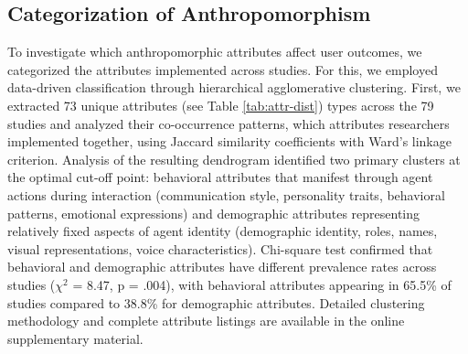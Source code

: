 \documentclass[manuscript,anonymous,sigconf]{acmart}
\begin{document}
\subsection{Categorization of Anthropomorphism}

To investigate which anthropomorphic attributes affect user outcomes, we categorized the attributes implemented across studies. For this, we employed data-driven classification through hierarchical agglomerative clustering. First, we extracted 73 unique attributes 
(see Table \ref{tab:attr-dist}) 
types across the 79 studies and analyzed their co-occurrence patterns, which attributes researchers implemented together, using Jaccard similarity coefficients with Ward's linkage criterion. %
Analysis of the resulting dendrogram identified two primary clusters at the optimal cut-off point: behavioral attributes that manifest through agent actions during interaction (communication style, personality traits, behavioral patterns, emotional expressions) and demographic attributes representing relatively fixed aspects of agent identity (demographic identity, roles, names, visual representations, voice characteristics). Chi-square test confirmed that behavioral and demographic attributes have different prevalence rates across studies ($\chi^2$ = 8.47, p = .004), with behavioral attributes appearing in 65.5\% of studies compared to 38.8\% for demographic attributes. Detailed clustering methodology and complete attribute listings are available in the online supplementary material.
\end{document}
